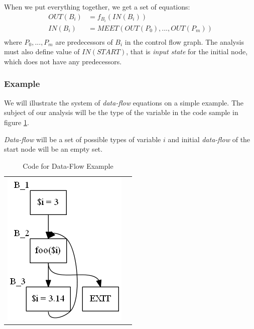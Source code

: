         When we put everything together, we get a set of equations:
        \begin{align*}
            OUT(B_i) &= f_{B_i}(IN(B_i)) \\
            IN(B_i) &= \mathit{MEET}(OUT(P_0), ..., OUT(P_m)) \\ 
        \end{align*}
        where $P_0, ..., P_m$ are predecessors of $B_i$ in the 
        control flow graph. The analysis must also define value 
        of $IN(START)$, that is \emph{input state} for the 
        initial node, which does not have any predecessors.
        
        \subsubsection*{Example}
        We will illustrate the system of \emph{data-flow} equations on a 
        simple example. The subject of our analysis will be the 
        type of the variable  in the code sample in figure \ref{dfacfg}.
        
        \emph{Data-flow} will be a set of possible types of variable $i$ and 
        initial \emph{data-flow} of the start node will be an empty set.

\begin{table}[h]
  \begin{tabular}{ l | m{6cm} }
  \centering
    \includegraphics[scale=0.7]{img/dfa-cfg.png}
  &
 
\begin{minipage}{6cm}
\end{minipage}

  \\
  \end{tabular}
  \caption{Code for Data-Flow Example\label{dfacfg}}  
\end{table}


